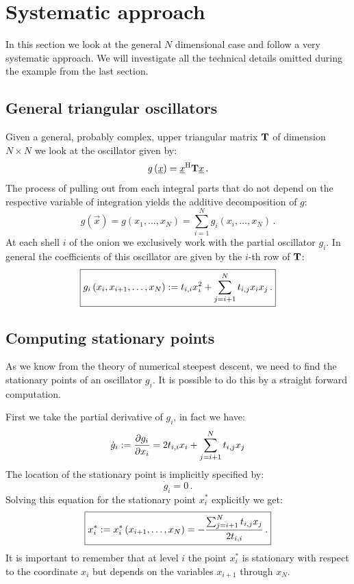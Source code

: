 \documentclass[a4paper,10pt]{article}
\begin{document}
\section{Systematic approach}


In this section we look at the general $N$ dimensional case
and follow a very systematic approach. We will investigate
all the technical details omitted during the example from
the last section.


\subsection{General triangular oscillators}


Given a general, probably complex, upper triangular
matrix $\mathbf{T}$ of dimension $N \times N$ we look at
the oscillator given by:
\begin{equation} \label{eq:triangular_oscillator}
  g\left(\underline{x}\right) = \underline{x}{}^{\textnormal{H}} \mathbf{T} \underline{x} \,.
\end{equation}
The process of pulling out from each integral parts that do not
depend on the respective variable of integration yields the
additive decomposition of $g$:
\begin{equation}
  g\left(\vec{x}\right) = g\left(x_1, \ldots, x_N\right) = \sum_{i=1}^N g_i(x_i, \ldots, x_N) \,.
\end{equation}
At each shell $i$ of the onion we exclusively work with the
partial oscillator $g_i$. In general the coefficients of this
oscillator are given by the $i$-th row of $\mathbf{T}$:
\begin{equation} \label{eq:general_partial_gi}
\boxed{
  g_i\left(x_i, x_{i+1}, \ldots, x_N\right)
  := t_{i,i} x_i^2 + \sum_{j=i+1}^{N} t_{i,j} x_i x_j \,.
}
\end{equation}


\subsection{Computing stationary points}


As we know from the theory of numerical steepest descent, we need
to find the stationary points of an oscillator $g_i$. It is possible
to do this by a straight forward computation.

First we take the partial derivative of $g_i$, in fact we have:
\begin{equation}
 \dot{g}_i := \frac{\partial g_i}{\partial x_i}
              = 2 t_{i,i} x_i + \sum_{j=i+1}^{N} t_{i,j} x_j
\end{equation}
The location of the stationary point is implicitly specified by:
\begin{equation}
  \dot{g}_i = 0 \,.
\end{equation}
Solving this equation for the stationary point $x^*_i$ explicitly we get:
\begin{equation} \label{eq:stationary_point_xi}
\boxed{
  x_i^*
  := x_i^{*}\left(x_{i+1}, \ldots, x_N\right)
  = - \frac{ \sum_{j=i+1}^{N} t_{i,j} x_j }{ 2 t_{i,i} } \,.
}
\end{equation}
It is important to remember that at level $i$ the point $x_i^*$
is stationary with respect to the coordinate $x_i$ but
depends on the variables $x_{i+1}$ through $x_N$.
\end{document}
